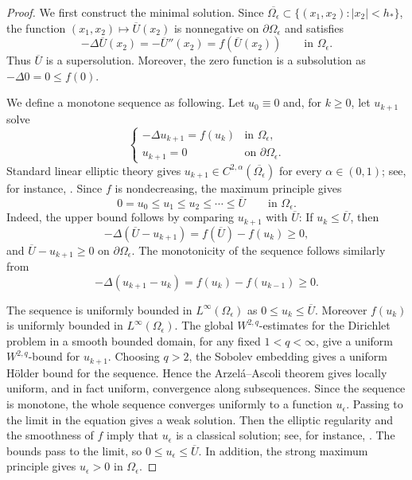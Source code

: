 \documentclass[reqno,12pt]{amsart}
\numberwithin{equation}{section}
\theoremstyle{remark}
\begin{document}
\begin{proof}
We first construct the minimal solution. Since
$\overline{\Omega_\epsilon}\subset\{(x_1,x_2): |x_2|<h_*\}$, 
the function
$(x_1,x_2)\mapsto \overline U(x_2)$ is nonnegative on $\partial\Omega_\epsilon$ and satisfies
$$
-\Delta \overline U(x_2)=-\overline U''(x_2)=f(\overline U(x_2))
\qquad\text{in }\Omega_\epsilon.
$$
Thus $\overline U$ is a supersolution.  Moreover, the zero function is a subsolution as  $-\Delta0=0\le f(0)$.

We define a monotone sequence as following. Let  $u_0\equiv0$ and, for $k\ge0$, let
$u_{k+1}$ solve
$$
\begin{cases}
-\Delta u_{k+1}=f(u_k) & \text{in }\Omega_\epsilon,\\
u_{k+1}=0 & \text{on }\partial\Omega_\epsilon.
\end{cases}
$$
Standard linear elliptic theory gives $u_{k+1}\in C^{2,\alpha}
(\overline{\Omega_\epsilon})$ for every $\alpha\in(0,1)$; see, for instance, \cite[Chapter 6]{GT2001}. Since
$f$ is nondecreasing, the maximum principle gives
$$
0=u_0\le u_1\le u_2\le\cdots\le \overline U
\qquad\text{in }\Omega_\epsilon.
$$
Indeed, the upper bound follows by comparing $u_{k+1}$ with
$\overline U$: If $u_k\le \overline U$, then
$$
-\Delta(\overline U-u_{k+1})=f(\overline U)-f(u_k)\ge0,
$$
and $\overline U-u_{k+1}\ge0$ on $\partial\Omega_\epsilon$. The monotonicity
of the sequence follows similarly from
$$
-\Delta(u_{k+1}-u_k)=f(u_k)-f(u_{k-1})\ge0.
$$


The sequence is uniformly bounded in $L^\infty(\Omega_\epsilon)$ as
$0\le u_k\le \overline U$.  Moreover $f(u_k)$ is uniformly bounded in
$L^\infty(\Omega_\epsilon)$.  The global $W^{2,q}$-estimates for the
Dirichlet problem in a smooth bounded domain, for any fixed $1<q<\infty$, give a
uniform $W^{2,q}$-bound for $u_{k+1}$.  Choosing $q>2$, the Sobolev
embedding gives a uniform H\"older bound for the sequence.  Hence the Arzel\'a--Ascoli
theorem gives locally uniform, and in fact uniform, convergence along subsequences.
Since the sequence is monotone, the whole sequence converges uniformly to a
function $u_\epsilon$.  Passing to the limit in the equation gives a weak
solution.  Then the elliptic regularity and the smoothness of $f$   imply
that $u_\epsilon$ is a classical solution; see, for instance,
\cite[Chapters 6 and 9]{GT2001}.  The bounds pass to the limit, so
$0\le u_\epsilon\le \overline U$.  In addition, the strong maximum principle gives
$u_\epsilon>0$ in $\Omega_\epsilon$.


\end{proof}
\end{document}
